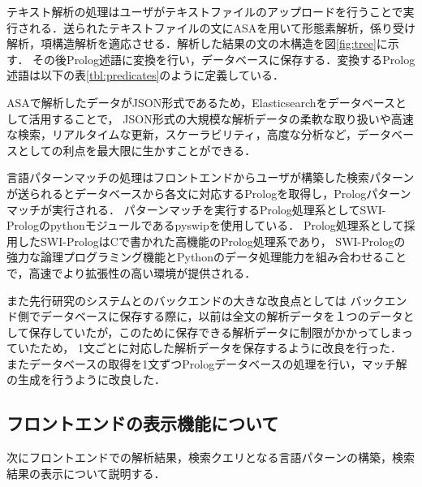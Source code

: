 \documentclass{FITpaper}
\begin{document}
テキスト解析の処理はユーザがテキストファイルのアップロードを行うことで実行される．送られたテキストファイルの文にASA{}を用いて形態素解析，係り受け解析，項構造解析を適応させる．解析した結果の文の木構造を図\ref{fig:tree}に示す．
その後Prolog述語に変換を行い，データベースに保存する．変換するProlog述語は以下の表\ref{tbl:predicates}のように定義している．%

ASAで解析したデータがJSON形式であるため，Elasticsearchをデータベースとして活用することで，
JSON形式の大規模な解析データの柔軟な取り扱いや高速な検索，リアルタイムな更新，スケーラビリティ，高度な分析など，データベースとしての利点を最大限に生かすことができる．



言語パターンマッチの処理はフロントエンドからユーザが構築した検索パターンが送られるとデータベースから各文に対応するPrologを取得し，Prologパターンマッチが実行される．
パターンマッチを実行するProlog処理系としてSWI-Prologのpythonモジュールであるpyswipを使用している．
Prolog処理系として採用したSWI-PrologはCで書かれた高機能のProlog処理系であり，
SWI-Prologの強力な論理プログラミング機能とPythonのデータ処理能力を組み合わせることで，高速でより拡張性の高い環境が提供される．

また先行研究のシステムとのバックエンドの大きな改良点としては
バックエンド側でデータベースに保存する際に，以前は全文の解析データを１つのデータとして保存していたが，このために保存できる解析データに制限がかかってしまっていたため，
1文ごとに対応した解析データを保存するように改良を行った．
またデータベースの取得を1文ずつPrologデータベースの処理を行い，マッチ解の生成を行うように改良した．







\subsection{フロントエンドの表示機能について}
次にフロントエンドでの解析結果，検索クエリとなる言語パターンの構築，検索結果の表示について説明する．
\end{document}
